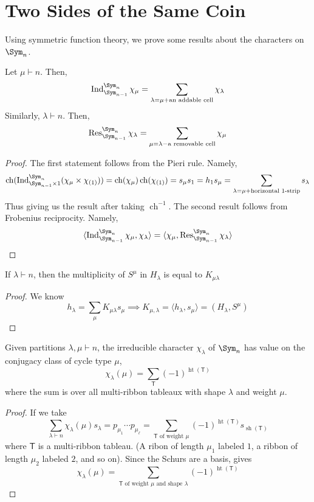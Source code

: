 \documentclass[11pt,leqno,oneside]{amsart}
\numberwithin{thm}{section}
\newcommand{\T}{\mathsf{T}}
\newcommand{\partitionof}{\vdash}
\newcommand{\ch}{\operatorname{ch}}
\newcommand{\Ind}{\operatorname{Ind}}
\newcommand{\Res}{\operatorname{Res}}
\newcommand{\sh}{\operatorname{sh}}
\newcommand{\height}{\operatorname{ht}}
\begin{document}
\section{Two Sides of the Same Coin}
Using symmetric function theory, we prove some results about the
characters on \(\Sym_n\).
\begin{thm}
  Let \(\mu \partitionof n\). Then, \[
    \Ind_{\Sym_{n-1}}^{\Sym_n} \chi_\mu = \sum_{\lambda = \mu+\text{an
      addable cell} } \chi_\lambda
  \]
  Similarly, \(\lambda \partitionof n\). Then, \[
    \Res_{\Sym_{n-1}}^{\Sym_n} \chi_\lambda = \sum_{\mu = \lambda -
      \text{a removable cell}} \chi_\mu 
  \]
\end{thm}
\begin{proof}
  The first statement follows from the Pieri rule. Namely, \[
    \ch(\Ind_{\Sym_{n-1} \times 1}^{\Sym_n} (\chi_\mu \times
    \chi_{(1)})) = \ch(\chi_\mu) \ch(\chi_{(1)}) = s_\mu s_1 = h_1
    s_\mu = \sum_{\lambda = \mu + \text{horizontal }1\text{-strip}}
    s_\lambda 
  \]
  Thus giving us the result after taking \(\ch^{-1}\). The second
  result follows from Frobenius reciprocity. Namely, \[
    \langle \Ind_{\Sym_{n-1}}^{\Sym_n} \chi_\mu, \chi_\lambda
    \rangle = \langle \chi_\mu, \Res_{\Sym_{n-1}}^{\Sym_n}
    \chi_\lambda \rangle  
  \]
\end{proof}
\begin{thm}
  If \(\lambda \partitionof n\), then the multiplicity of \(S^\mu\) in
  \(H_\lambda\) is equal to \(K_{\mu \lambda}\) 
\end{thm}
\begin{proof}
  We know \[
    h_\lambda = \sum_\mu K_{\mu \lambda} s_\mu \implies 
    K_{\mu,\lambda} = \langle h_\lambda, s_\mu \rangle = (H_\lambda ,
    S^\mu)
  \]
\end{proof}
\begin{thm}
  Given partitions \(\lambda, \mu \partitionof n\), the irreducible
  character \(\chi_\lambda\) of \(\Sym_n\) has value on the conjugacy
  class of cycle type \(\mu\), \[
    \chi_\lambda(\mu) = \sum_{\T} (-1)^{\height(\T)}
  \]
  where the sum is over all multi-ribbon tableaux with shape
  \(\lambda\) and weight \(\mu\).
\end{thm}
\begin{proof}
  If we take \[
    \sum_{\lambda \partitionof n} \chi_\lambda(\mu) s_\lambda =
    p_{\mu_1} \cdots p_{\mu_\ell} = \sum_{\T \text{ of weight }\mu}
    (-1)^{\height(\T)} s_{\sh(\T)} 
  \]
  where \(\T\) is a multi-ribbon tableau. (A ribon of length \(\mu_1\)
  labeled \(1\), a ribbon of length \(\mu_2\) labeled \(2\), and so
  on). Since the Schurs are a basis, gives \[ 
    \chi_\lambda(\mu) = \sum_{\T \text{ of weight }\mu\text{ and shape
      }\lambda} (-1)^{\height(\T)}
  \]
\end{proof}
\end{document}
